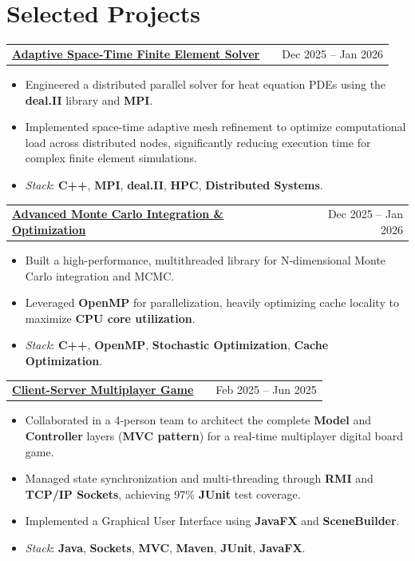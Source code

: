 \documentclass[a4paper,12pt]{article}
\makeatletter
\newenvironment{joblong}[2]
{
\begin{tabularx}{\linewidth}{@{}l X r@{}}
\textbf{#1} & \hfill & #2 \\[1pt]
\end{tabularx}
\begin{minipage}[t]{\linewidth}
\begin{itemize}[nosep,after=\strut, leftmargin=1em, itemsep=2pt,label=--]
}
{
\end{itemize}
\end{minipage}
\vspace{3pt}
}
\makeatother
\begin{document}
\section{Selected Projects}

\begin{joblong}{\href{https://github.com/DomDegi/space_and_time_adaptivity}{Adaptive Space-Time Finite Element Solver}}{Dec 2025 -- Jan 2026}
  \item Engineered a distributed parallel solver for heat equation PDEs using the \textbf{deal.II} library and \textbf{MPI}.
  \item Implemented space-time adaptive mesh refinement to optimize computational load across distributed nodes, significantly reducing execution time for complex finite element simulations.
  \item \textit{Stack}: \textbf{C++}, \textbf{MPI}, \textbf{deal.II}, \textbf{HPC}, \textbf{Distributed Systems}.
\end{joblong}

\begin{joblong}{\href{https://github.com/DomDegi/montecarlo-DGL}{Advanced Monte Carlo Integration \& Optimization}}{Dec 2025 -- Jan 2026}
  \item Built a high-performance, multithreaded library for N-dimensional Monte Carlo integration and MCMC.
  \item Leveraged \textbf{OpenMP} for parallelization, heavily optimizing cache locality to maximize \textbf{CPU core utilization}.
  \item \textit{Stack}: \textbf{C++}, \textbf{OpenMP}, \textbf{Stochastic Optimization}, \textbf{Cache Optimization}.
\end{joblong}

\begin{joblong}{\href{https://github.com/DomDegi/IS25-AM06}{Client-Server Multiplayer Game}}{Feb 2025 -- Jun 2025}
  \item Collaborated in a 4-person team to architect the complete \textbf{Model} and \textbf{Controller} layers (\textbf{MVC pattern}) for a real-time multiplayer digital board game.
  \item Managed state synchronization and multi-threading through \textbf{RMI} and \textbf{TCP/IP Sockets}, achieving 97\% \textbf{JUnit} test coverage.
  \item Implemented a Graphical User Interface using \textbf{JavaFX} and \textbf{SceneBuilder}.
  \item \textit{Stack}: \textbf{Java}, \textbf{Sockets}, \textbf{MVC}, \textbf{Maven}, \textbf{JUnit}, \textbf{JavaFX}.
\end{joblong}
\end{document}
